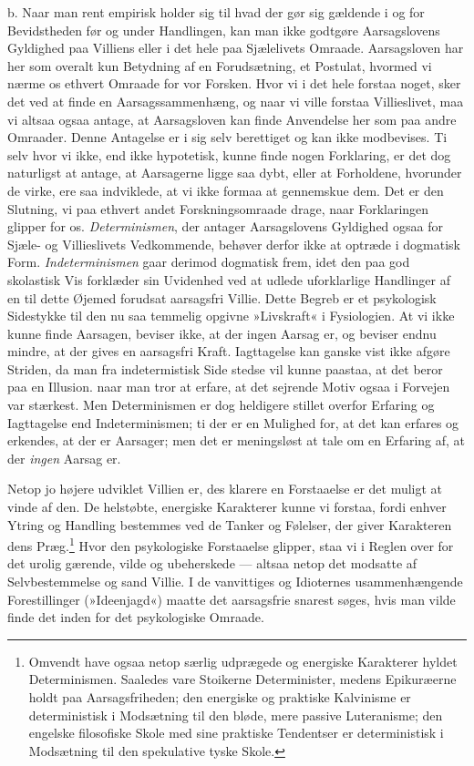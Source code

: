 \documentclass[12pt,a4paper,openany]{book}
\newcommand{\opage}[1]{\marginnote{\footnotesize\textit{[#1]}}}
\begin{document}
\opage{400}b. Naar man rent empirisk holder sig til hvad der gør sig
gældende i og for Bevidstheden før og under Handlingen, kan man ikke
godtgøre Aarsagslovens Gyldighed paa Villiens eller i det hele paa
Sjælelivets Omraade. Aarsagsloven har her som overalt kun Betydning af
en Forudsætning, et Postulat, hvormed vi nærme os ethvert Omraade for
vor Forsken. Hvor vi i det hele forstaa noget, sker det ved at finde en
Aarsagssammenhæng, og naar vi ville forstaa Villieslivet, maa vi altsaa
ogsaa antage, at Aarsagsloven kan finde Anvendelse her som paa andre
Omraader. Denne Antagelse er i sig selv berettiget og kan ikke
modbevises. Ti selv hvor vi ikke, end ikke hypotetisk, kunne finde nogen
Forklaring, er det dog naturligst at antage, at Aarsagerne ligge saa
dybt, eller at Forholdene, hvorunder de virke, ere saa indviklede, at vi
ikke formaa at gennemskue dem. Det er den Slutning, vi paa ethvert andet
Forskningsomraade drage, naar Forklaringen glipper for os.
\emph{Determinismen}, der antager Aarsagslovens Gyldighed ogsaa for
Sjæle- og Villieslivets Vedkommende, behøver derfor ikke at optræde i
dogmatisk Form. \emph{Indeterminismen} gaar derimod dogmatisk frem, idet
den paa god skolastisk Vis forklæder sin Uvidenhed ved at udlede
uforklarlige Handlinger af en til dette Øjemed forudsat aarsagsfri
Villie. Dette Begreb er et psykologisk Sidestykke til den nu saa
temmelig opgivne »Livskraft« i Fysiologien. At vi ikke kunne finde
Aarsagen, beviser ikke, at der ingen Aarsag er, og beviser endnu mindre,
at der gives en aarsagsfri Kraft. Iagttagelse kan ganske vist ikke
afgøre Striden, da man fra indetermistisk Side stedse vil kunne paastaa,
at det beror paa en Illusion. naar man tror at erfare, at det sejrende
Motiv ogsaa i Forvejen var stærkest. Men Determinismen er dog heldigere
stillet overfor Erfaring og Iagttagelse end Indeterminismen; ti der er
en Mulighed for, at det kan erfares og erkendes, at der er Aarsager; men
det er meningsløst at tale om en Erfaring af, at der \emph{ingen} Aarsag
er.

Netop jo højere udviklet Villien er, des klarere en Forstaaelse er det
muligt at vinde af den. De helstøbte, energiske Karakterer kunne vi
forstaa, fordi enhver Ytring og Handling bestemmes ved de Tanker og
Følelser, der giver Karakteren
\opage{401}dens Præg.\footnote[1]{Omvendt have ogsaa netop særlig
udprægede og energiske Karakterer hyldet Determinismen. Saaledes vare
Stoikerne Determinister, medens Epikuræerne holdt paa Aarsagsfriheden;
den energiske og praktiske Kalvinisme er deterministisk i Modsætning til
den bløde, mere passive Luteranisme; den engelske filosofiske Skole med
sine praktiske Tendentser er deterministisk i Modsætning til den
spekulative tyske Skole.} Hvor den psykologiske Forstaaelse glipper,
staa vi i Reglen over for det urolig gærende, vilde og ubeherskede ---
altsaa netop det modsatte af Selvbestemmelse og sand Villie. I de
vanvittiges og Idioternes usammenhængende Forestillinger (»Ideenjagd«)
maatte det aarsagsfrie snarest søges, hvis man vilde finde det inden for
det psykologiske Omraade.
\end{document}
